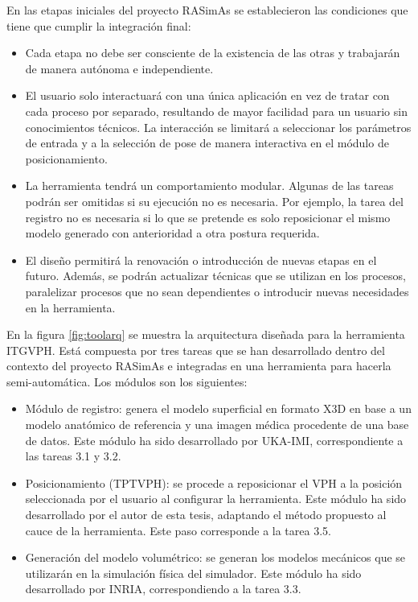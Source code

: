 En las etapas iniciales del proyecto \ac{RASimAs} se establecieron las condiciones que tiene que cumplir la integración final:
\begin{itemize}
    \item Cada etapa no debe ser consciente de la existencia de las otras y trabajarán de manera autónoma e independiente.
    
    \item El usuario solo interactuará con una única aplicación en vez de tratar con cada proceso por separado, resultando de mayor facilidad para un usuario sin conocimientos técnicos. La interacción se limitará a seleccionar los parámetros de entrada y a la selección de pose de manera interactiva en el módulo de posicionamiento.
    
    \item La herramienta tendrá un comportamiento modular. Algunas de las tareas podrán ser omitidas si su ejecución no es necesaria. Por ejemplo, la tarea del registro no es necesaria si lo que se pretende es solo reposicionar el mismo modelo generado con anterioridad a otra postura requerida.
    
    \item El diseño permitirá la renovación o introducción de nuevas etapas en el futuro. Además, se podrán actualizar técnicas que se utilizan en los procesos, paralelizar procesos que no sean dependientes o introducir nuevas necesidades en la herramienta.
\end{itemize}

En la figura \ref{fig:toolarq} se muestra la arquitectura diseñada para la herramienta \ac{ITGVPH}.  Está compuesta por tres tareas que se han desarrollado dentro del contexto del proyecto \ac{RASimAs} e integradas en una herramienta para hacerla semi-automática. Los módulos son los siguientes: 
\begin{itemize}
    \item Módulo de registro:
    genera el modelo superficial en formato \ac{X3D} en base a un modelo anatómico de referencia y una imagen médica procedente de una base de datos. Este módulo ha sido desarrollado por \ac{UKA-IMI}, correspondiente a las tareas 3.1 y 3.2.
    \item Posicionamiento (\ac{TPTVPH}):
    se procede a reposicionar el \ac{VPH} a la posición seleccionada por el usuario al configurar la herramienta. Este módulo ha sido desarrollado por el autor de esta tesis, adaptando el método propuesto al cauce de la herramienta. Este paso corresponde a la tarea 3.5.
    \item Generación del modelo volumétrico:
    se generan los modelos mecánicos que se utilizarán en la simulación física del simulador. Este módulo ha sido desarrollado por \ac{INRIA}, correspondiendo a la tarea 3.3.
\end{itemize}

